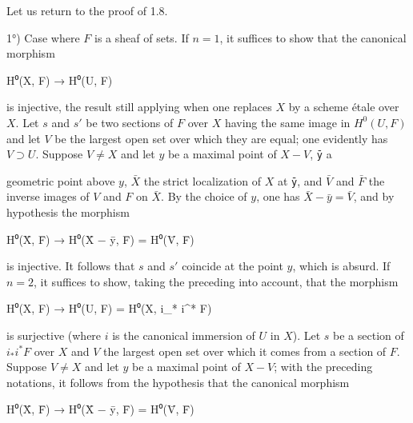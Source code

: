 \documentclass[
  11pt,
  a4paper,
]{book}
\newenvironment{Shaded}{}{}
\newcommand{\NormalTok}[1]{#1}
\begin{document}
Let us return to the proof of 1.8.

1°) Case where \(F\) is a sheaf of sets. If \(n = 1\), it suffices to
show that the canonical morphism

\begin{Shaded}
\begin{Highlighting}[]
\NormalTok{H⁰(X, F) → H⁰(U, F)}
\end{Highlighting}
\end{Shaded}

is injective, the result still applying when one replaces \(X\) by a
scheme étale over \(X\). Let \(s\) and \(s'\) be two sections of \(F\)
over \(X\) having the same image in \(H^{0}(U, F)\) and let \(V\) be the
largest open set over which they are equal; one evidently has
\(V \supset U\). Suppose \(V \neq X\) and let \(y\) be a maximal point
of \(X - V\), \texttt{ȳ} a

geometric point above \(y\), \(\bar{X}\) the strict localization of
\(X\) at \texttt{ȳ}, and \(\bar{V}\) and \(\bar{F}\) the inverse images
of \(V\) and \(F\) on \(\bar{X}\). By the choice of \(y\), one has
\(\bar{X} - \bar{y} = \bar{V}\), and by hypothesis the morphism

\begin{Shaded}
\begin{Highlighting}[]
\NormalTok{H⁰(X̄, F̄) → H⁰(X̄ − ȳ, F̄) = H⁰(V̄, F̄)}
\end{Highlighting}
\end{Shaded}

is injective. It follows that \(s\) and \(s'\) coincide at the point
\(y\), which is absurd. If \(n = 2\), it suffices to show, taking the
preceding into account, that the morphism

\begin{Shaded}
\begin{Highlighting}[]
\NormalTok{H⁰(X, F) → H⁰(U, F) = H⁰(X, i\_* i\^{}* F)}
\end{Highlighting}
\end{Shaded}

is surjective (where \(i\) is the canonical immersion of \(U\) in
\(X\)). Let \(s\) be a section of \(i_{*} i^{*} F\) over \(X\) and \(V\)
the largest open set over which it comes from a section of \(F\).
Suppose \(V \neq X\) and let \(y\) be a maximal point of \(X - V\); with
the preceding notations, it follows from the hypothesis that the
canonical morphism

\begin{Shaded}
\begin{Highlighting}[]
\NormalTok{H⁰(X̄, F̄) → H⁰(X̄ − ȳ, F̄) = H⁰(V̄, F̄)}
\end{Highlighting}
\end{Shaded}
\end{document}
